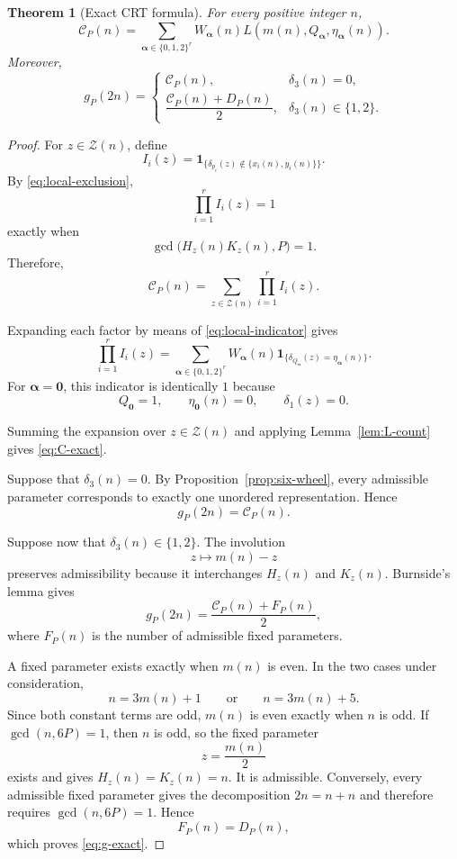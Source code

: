 \documentclass[12pt]{article}
\numberwithin{equation}{section}
\newtheorem{theorem}{Theorem}[section]
\theoremstyle{definition}
\theoremstyle{remark}
\newcommand{\one}[1]{\mathbf 1_{\{#1\}}}
\newcommand{\Ccal}{\mathcal C}
\newcommand{\Zcal}{\mathcal Z}
\begin{document}
\begin{theorem}[Exact CRT formula]
\label{thm:exact-formula}
For every positive integer $n$,
\begin{equation}
\label{eq:C-exact}
\Ccal_P(n)
=
\sum_{\boldsymbol\alpha\in\{0,1,2\}^{r}}
W_{\boldsymbol\alpha}(n)
L\left(
m(n),
Q_{\boldsymbol\alpha},
\eta_{\boldsymbol\alpha}(n)
\right).
\end{equation}
Moreover,
\begin{equation}
\label{eq:g-exact}
g_P(2n)
=
\begin{cases}
\Ccal_P(n),
&
\delta_3(n)=0,
\\[5pt]
\dfrac{\Ccal_P(n)+D_P(n)}{2},
&
\delta_3(n)\in\{1,2\}.
\end{cases}
\end{equation}
\end{theorem}

\begin{proof}
For $z\in\Zcal(n)$, define
\[
I_i(z)
=
\one{
\delta_{p_i}(z)\notin\{x_i(n),y_i(n)\}
}.
\]
By \eqref{eq:local-exclusion},
\[
\prod_{i=1}^{r}I_i(z)=1
\]
exactly when
\[
\gcd\bigl(H_z(n)K_z(n),P\bigr)=1.
\]
Therefore,
\begin{equation}
\label{eq:C-indicator-sum}
\Ccal_P(n)
=
\sum_{z\in\Zcal(n)}
\prod_{i=1}^{r}I_i(z).
\end{equation}

Expanding each factor by means of
\eqref{eq:local-indicator} gives
\[
\prod_{i=1}^{r}I_i(z)
=
\sum_{\boldsymbol\alpha\in\{0,1,2\}^{r}}
W_{\boldsymbol\alpha}(n)
\one{
\delta_{Q_{\boldsymbol\alpha}}(z)
=
\eta_{\boldsymbol\alpha}(n)
}.
\]
For $\boldsymbol\alpha=\boldsymbol0$, this indicator is
identically $1$ because
\[
Q_{\boldsymbol0}=1,
\qquad
\eta_{\boldsymbol0}(n)=0,
\qquad
\delta_1(z)=0.
\]

Summing the expansion over $z\in\Zcal(n)$ and applying
Lemma~\ref{lem:L-count} gives \eqref{eq:C-exact}.

Suppose that $\delta_3(n)=0$. By
Proposition~\ref{prop:six-wheel}, every admissible parameter
corresponds to exactly one unordered representation. Hence
\[
g_P(2n)=\Ccal_P(n).
\]

Suppose now that $\delta_3(n)\in\{1,2\}$. The involution
\[
z\longmapsto m(n)-z
\]
preserves admissibility because it interchanges $H_z(n)$ and
$K_z(n)$. Burnside's lemma gives
\[
g_P(2n)
=
\frac{\Ccal_P(n)+F_P(n)}{2},
\]
where $F_P(n)$ is the number of admissible fixed parameters.

A fixed parameter exists exactly when $m(n)$ is even. In the two
cases under consideration,
\[
n=3m(n)+1
\qquad\text{or}\qquad
n=3m(n)+5.
\]
Since both constant terms are odd, $m(n)$ is even exactly when
$n$ is odd. If $\gcd(n,6P)=1$, then $n$ is odd, so the fixed
parameter
\[
z=\frac{m(n)}2
\]
exists and gives $H_z(n)=K_z(n)=n$. It is admissible. Conversely,
every admissible fixed parameter gives the decomposition
$2n=n+n$ and therefore requires $\gcd(n,6P)=1$. Hence
\[
F_P(n)=D_P(n),
\]
which proves \eqref{eq:g-exact}.
\end{proof}
\end{document}
